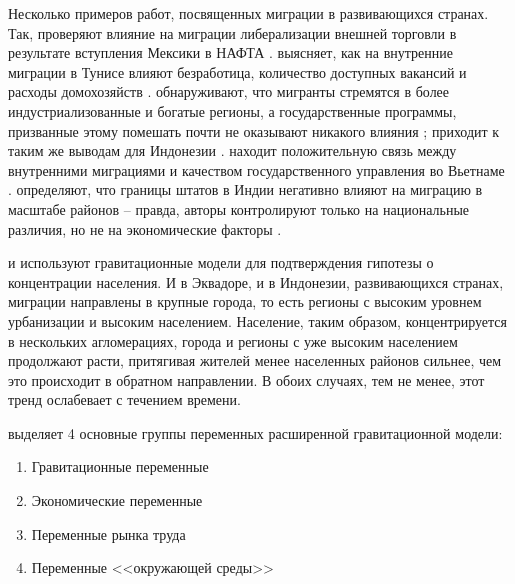 \documentclass[a4paper,12pt]{article}
\begin{document}
Несколько примеров работ, посвященных миграции в развивающихся странах. Так, \citeauthor{mexico_2013} проверяют влияние на миграции либерализации внешней торговли в результате вступления Мексики в НАФТА \citep{mexico_2013}.
\citeauthor{tunis_2018} выясняет, как на внутренние миграции в Тунисе влияют безработица, количество доступных вакансий и расходы домохозяйств \citep{tunis_2018}.
\citeauthor{vietnam_1997} обнаруживают, что мигранты стремятся в более индустриализованные и богатые регионы, а государственные программы, призванные этому помешать почти не оказывают никакого влияния \citep{vietnam_1997}; \citeauthor{indonesia_2012} приходит к таким же выводам для Индонезии \citep{indonesia_2012}.
\citeauthor{vietnam_2020} находит положительную связь между внутренними миграциями и качеством государственного управления во Вьетнаме \citep{vietnam_2020}.
\citeauthor{india_2018} определяют, что границы штатов в Индии негативно влияют на миграцию в масштабе районов -- правда, авторы контролируют только на национальные различия, но не на экономические факторы \citep{india_2018}.

\citeauthor{indonesia_2017} и \citeauthor{equador_2018} используют гравитационные модели для подтверждения гипотезы о концентрации населения. И в Эквадоре, и в Индонезии, развивающихся странах, миграции направлены в крупные города, то есть регионы с высоким уровнем урбанизации и высоким населением. 
Население, таким образом, концентрируется в нескольких агломерациях, города и регионы с уже высоким населением продолжают расти, притягивая жителей менее населенных районов сильнее, чем это происходит в обратном направлении. 
В обоих случаях, тем не менее, этот тренд ослабевает с течением времени.


\citet{etzo_internal_2008} выделяет 4 основные группы переменных расширенной гравитационной модели:
\begin{enumerate}
	\item Гравитационные переменные
	\item Экономические переменные
	\item Переменные рынка труда
	\item Переменные <<окружающей среды>>
\end{enumerate}
\end{document}
